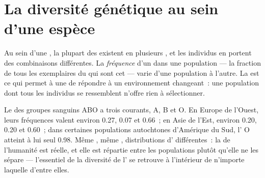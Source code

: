 \section{La diversité génétique au sein d'une espèce}

\begin{proposition}\label{prop:g10:biodiversity-scales:genetic}
Au sein d'une , la plupart des  existent en plusieurs
, et les individus en portent des combinaisons différentes. La
\emph{fréquence} d'un  dans une population --- la fraction de
tous les exemplaires du  qui sont cet  --- varie d'une
population à l'autre. La  est ce qui permet à une
 de répondre à un environnement changeant~: une population dont
tous les individus se ressemblent n'offre rien à sélectionner.
\end{proposition}
\admitted

\begin{example}\label{ex:g10:biodiversity-scales:abo}
Le  des groupes sanguins ABO a trois  courants, A, B et O.
En Europe de l'Ouest, leurs fréquences valent environ 0.27, 0.07 et
0.66~; en Asie de l'Est, environ 0.20, 0.20 et 0.60~; dans certaines
populations autochtones d'Amérique du Sud, l' O atteint à lui
seul 0.98. Même , même , distributions d'
différentes~: la  de l'humanité est réelle, et elle
est répartie entre les populations plutôt qu'elle ne les sépare ---
l'essentiel de la diversité de l' se retrouve à l'intérieur de
n'importe laquelle d'entre elles.
\end{example}

